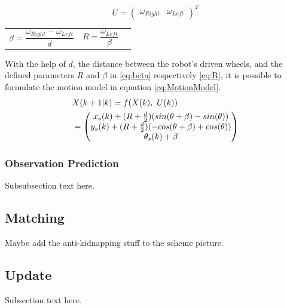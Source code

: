 \begin{equation}
U=\begin{pmatrix}\omega_{Right} & \omega_{Left} \end{pmatrix}^T \label{eq:input}
\end{equation}
\noindent \begin{tabularx}{\textwidth}{@{}XXX@{}}
\begin{equation} 
\beta=\frac{\omega_{Right}-\omega_{Left}}{d} \label{eq:beta}
\end{equation} &
\begin{equation}
R=\frac{\omega_{Left}}{\beta} \label{eq:R}
\end{equation}
\end{tabularx}
With the help of $d$, the distance between the robot's driven wheels, and the defined parameters $R$ and $\beta$ in \eqref{eq:beta} respectively \eqref{eq:R}, it is possible to formulate the motion model in equation \eqref{eq:MotionModel}.
\begin{align}
&X(k+1|k)=f(X(k),~U(k)) \nonumber\\ &= \begin{pmatrix} x_s(k) + (R+\frac{d}{2})(sin(\theta+ \beta)-sin(\theta)) \\ y_s(k) + (R+{{d}\over{2}})(-cos(\theta+ \beta)+cos(\theta)) \\ \theta_s(k) + \beta\end{pmatrix}
\label{eq:MotionModel}
\end{align}

\subsubsection{Observation Prediction}
\label{subsubsec:subsubsection_Tag}
Subsubsection text here.

\subsection{Matching}
\label{subsec:Matching}
Maybe add the anti-kidnapping stuff to the scheme picture.

\subsection{Update}
\label{subsec:Update}
Subsection text here.

